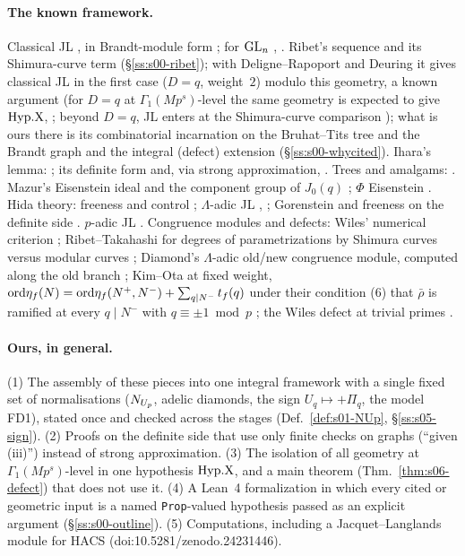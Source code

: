 \paragraph{The known framework.} Classical JL \cite[Thm.~16.1]{JL}, in Brandt-module form \cite{Gr99}; for $\mathrm{GL}_n$ \cite[Thm.~5.1]{Bad08},
\cite[Thm.~18.1]{BR10}. Ribet's sequence and its Shimura-curve term \cite[Prop.~3.1, Thm.~3.15, Thm.~4.1]{Ri90} (\S\ref{ss:s00-ribet}); with
Deligne--Rapoport and Deuring it gives classical JL in the first case ($D=q$, weight~$2$) modulo this geometry, a known argument (for $D=q$ at $\Gamma_1(Mp^s)$-level the same geometry is expected to give $\mathrm{Hyp.X}$,
\stexp; beyond $D=q$, JL enters at the Shimura-curve comparison \cite[\S3.10.1]{RS});
what is ours there is its combinatorial incarnation on the Bruhat--Tits tree and the Brandt graph and the integral (defect)
extension (\S\ref{ss:s00-whycited}).
Ihara's lemma: \cite{Ih75}; its definite form \cite[Thm.~3.15, Rem.~3.18]{Ri90} and, via strong approximation, \cite[Lemma~2,
pp.~445--446]{DT}. Trees and amalgams: \cite[Ch.~II, \S1]{Se}. Mazur's Eisenstein ideal and the component group of $J_0(q)$
\cite[Appendix, Thm.~A.1(b), p.~173]{Mz}; $\Phi$ Eisenstein \cite[Thm.~3.12]{Ri90}. Hida theory: freeness and control
\cite[Thm.~3.1, Cor.~3.2]{Hi86b}; $\Lambda$-adic JL \cite[Prop.~6.1]{LV}, \cite[\S4.5]{Hs}; Gorenstein and freeness on the definite side
\cite[Thm.~4.5]{Hs}. $p$-adic JL \cite[Thm.~3, \S4.6]{Ch}. Congruence modules and defects: Wiles' numerical criterion
\cite[Appendix, Props.~1, 2, pp.~545--547]{Wi95}; Ribet--Takahashi for degrees of parametrizations by Shimura curves versus modular
curves \cite[Thm.~1, p.~11111]{RT97}; Diamond's $\Lambda$-adic old/new congruence module, computed along the old branch
\cite[Thm.~6A--6C, p.~80]{Dia89}; Kim--Ota at fixed weight, $\mathrm{ord}\eta_f(N)=\mathrm{ord}\eta_f(N^+,N^-)+\sum_{q\mid N^-}t_f(q)$ under their
condition (6) that $\bar\rho$ is ramified at every $q\mid N^-$ with $q\equiv\pm1\bmod p$ \cite[Thm.~1.1, p.~1]{KO}; the Wiles defect at
trivial primes \cite[Thm.~1.2]{BKM}.

\paragraph{Ours, in general.} (1) The assembly of these pieces into one integral framework with a single fixed set of
normalisations ($N_{U_p}$, adelic diamonds, the sign $U_q\mapsto+\Pi_q$, the model FD1), stated once and checked across the stages
(Def.~\ref{def:s01-NUp}, \S\ref{ss:s05-sign}). (2) Proofs on the definite side that use only finite checks on graphs (``given
(iii)'') instead of strong approximation. (3) The isolation of all geometry at $\Gamma_1(Mp^s)$-level in one hypothesis $\mathrm{Hyp.X}$, and a
main theorem (Thm.~\ref{thm:s06-defect}) that does not use it. (4) A Lean~4 formalization in which every cited or geometric input is
a named \texttt{Prop}-valued hypothesis passed as an explicit argument (\S\ref{ss:s00-outline}). (5) Computations, including a
Jacquet--Langlands module for HACS (doi:10.5281/zenodo.24231446).

